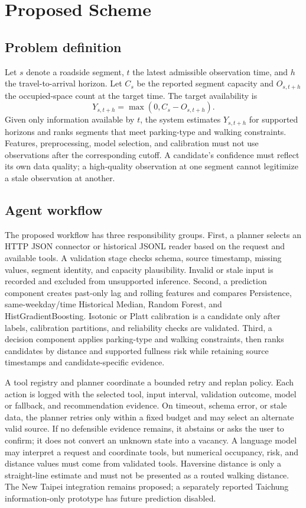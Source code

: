 \documentclass[conference,letterpaper,10pt]{IEEEtran}
\begin{document}
\section{Proposed Scheme}
\subsection{Problem definition}
Let $s$ denote a roadside segment, $t$ the latest admissible observation time, and $h$ the travel-to-arrival horizon. Let $C_s$ be the reported segment capacity and $O_{s,t+h}$ the occupied-space count at the target time. The target availability is
\begin{equation}
Y_{s,t+h}=\max(0,C_s-O_{s,t+h}).
\end{equation}
Given only information available by $t$, the system estimates $Y_{s,t+h}$ for supported horizons and ranks segments that meet parking-type and walking constraints. Features, preprocessing, model selection, and calibration must not use observations after the corresponding cutoff. A candidate's confidence must reflect its own data quality; a high-quality observation at one segment cannot legitimize a stale observation at another.

\subsection{Agent workflow}
The proposed workflow has three responsibility groups. First, a planner selects an HTTP JSON connector or historical JSONL reader based on the request and available tools. A validation stage checks schema, source timestamp, missing values, segment identity, and capacity plausibility. Invalid or stale input is recorded and excluded from unsupported inference. Second, a prediction component creates past-only lag and rolling features and compares Persistence, same-weekday/time Historical Median, Random Forest, and HistGradientBoosting. Isotonic or Platt calibration is a candidate only after labels, calibration partitions, and reliability checks are validated. Third, a decision component applies parking-type and walking constraints, then ranks candidates by distance and supported fullness risk while retaining source timestamps and candidate-specific evidence.

A tool registry and planner coordinate a bounded retry and replan policy. Each action is logged with the selected tool, input interval, validation outcome, model or fallback, and recommendation evidence. On timeout, schema error, or stale data, the planner retries only within a fixed budget and may select an alternate valid source. If no defensible evidence remains, it abstains or asks the user to confirm; it does not convert an unknown state into a vacancy. A language model may interpret a request and coordinate tools, but numerical occupancy, risk, and distance values must come from validated tools. Haversine distance is only a straight-line estimate and must not be presented as a routed walking distance. The New Taipei integration remains proposed; a separately reported Taichung information-only prototype has future prediction disabled.
\end{document}

